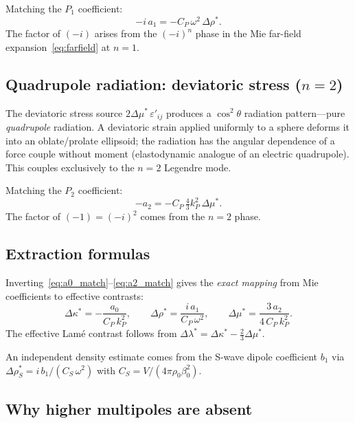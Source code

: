 \documentclass[11pt,a4paper]{article}
\newcommand{\Dlam}{\Delta\lambda}
\newcommand{\Dmu}{\Delta\mu}
\newcommand{\Drho}{\Delta\rho}
\newcommand{\Dkappa}{\Delta\kappa}
\begin{document}
Matching the $P_1$ coefficient:
\begin{equation}
  -i\,a_1 = -C_P\,\omega^2\,\Drho^*.
  \label{eq:a1_match}
\end{equation}
The factor of $(-i)$ arises from the $(-i)^n$ phase in the Mie
far-field expansion~\eqref{eq:farfield} at $n = 1$.

\subsection{Quadrupole radiation: deviatoric stress \texorpdfstring{($n = 2$)}{(n=2)}}

The deviatoric stress source $2\Dmu^*\,\varepsilon'_{ij}$ produces a
$\cos^2\!\theta$ radiation pattern---pure \emph{quadrupole} radiation.
A deviatoric strain applied uniformly to a sphere deforms it into an
oblate/prolate ellipsoid; the radiation has the angular dependence of
a force couple without moment (elastodynamic analogue of an electric
quadrupole).  This couples exclusively to the $n = 2$ Legendre mode.

Matching the $P_2$ coefficient:
\begin{equation}
  -a_2 = -C_P\,\tfrac{4}{3}k_P^2\,\Dmu^*.
  \label{eq:a2_match}
\end{equation}
The factor of $(-1) = (-i)^2$ comes from the $n = 2$ phase.

\subsection{Extraction formulas}

Inverting~\eqref{eq:a0_match}--\eqref{eq:a2_match} gives the
\emph{exact mapping} from Mie coefficients to effective contrasts:
\begin{equation}
  \boxed{
  \Dkappa^* = -\frac{a_0}{C_P\,k_P^2},
  \qquad
  \Drho^* = \frac{i\,a_1}{C_P\,\omega^2},
  \qquad
  \Dmu^* = \frac{3\,a_2}{4\,C_P\,k_P^2}.
  }
  \label{eq:extraction}
\end{equation}
The effective Lam\'e contrast follows from $\Dlam^* = \Dkappa^* -
\tfrac{2}{3}\Dmu^*$.

An independent density estimate comes from the S-wave dipole
coefficient $b_1$ via $\Drho^*_S = i\,b_1 / (C_S\,\omega^2)$
with $C_S = V/(4\pi\rho_0\beta_0^2)$.

\subsection{Why higher multipoles are absent}
\end{document}
